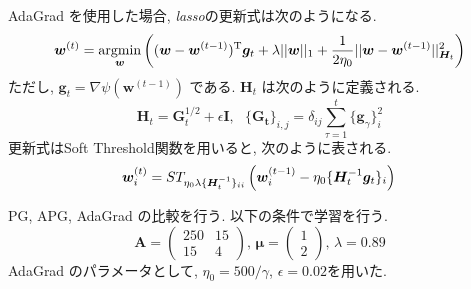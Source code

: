 \documentclass[a4paper,10pt]{jsarticle}
\newcommand{\argmin}{\mathop{\rm argmin}\limits}
\begin{document}
AdaGrad を使用した場合, \textit{lasso}の更新式は次のようになる.
\[
  \bm{w}^{(t)}
 = \argmin_{\bm{w}}\left((\bm{w} - \bm{w}^{(t-1)})^\mathrm{T}\bm{g}_t+\lambda||\bm{w}||_1
 +\frac{1}{2\eta_0}||\bm{w}-\bm{w}^{(t-1)}||^2_{\bm{H}_t}\right)
\]
ただし, $\bm{g}_t=\nabla\psi(\bm{w}^{(t-1)})$ である.
$\bm{H}_t$ は次のように定義される.
\[
 \bm{H}_t = \bm{G}^{1/2}_t + \epsilon\bm{I},\,\,\,\,
  \{\bm{G_t}\}_{i,j}=\delta_{ij}\sum_{\tau=1}^{t}\{\bm{g}_{\gamma}\}^2_i
\]
更新式はSoft Threshold関数を用いると, 次のように表される.
\[
 \bm{w}^{(t)}_i = ST_{\eta_0\lambda\{\bm{H}_t^{-1}\}_{ii}}
 \left(\bm{w}^{(t-1)}_i-\eta_0\{\bm{H}^{-1}_t\bm{g}_t\}_i\right)\\
\]

PG, APG, AdaGrad の比較を行う. 以下の条件で学習を行う.
\[
 \bm{A} = \left(\begin{array}{cc} 250 & 15 \\ 15 & 4 \end{array}\right), \,
 \bm{\mu} = \left(\begin{array}{c} 1 \\ 2 \end{array}\right), \,
 \lambda = 0.89
\]
AdaGrad のパラメータとして, $\eta_0=500/\gamma$, $\epsilon=0.02$を用いた.
\end{document}

